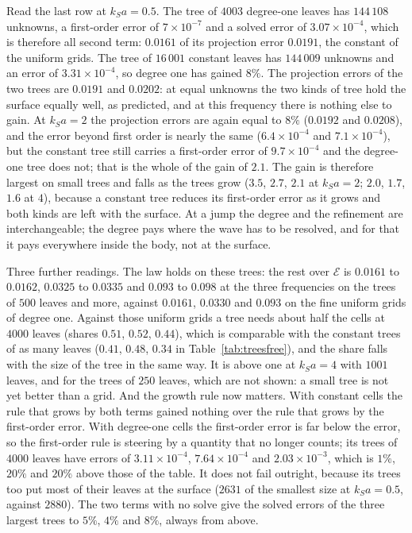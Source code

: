 \documentclass[11pt,a4paper]{article}
\newcommand{\cE}{\mathcal{E}}
\begin{document}
Read the last row at $k_Sa=0.5$. The tree of $4003$ degree-one leaves has $144\,108$ unknowns, a
first-order error of $7\times10^{-7}$ and a solved error of $3.07\times10^{-4}$, which is therefore all
second term: $0.0161$ of its projection error $0.0191$, the constant of the uniform grids. The tree of
$16\,001$ constant leaves has $144\,009$ unknowns and an error of $3.31\times10^{-4}$, so degree one has
gained $8\%$. The projection errors of the two trees are $0.0191$ and $0.0202$: at equal unknowns the two
kinds of tree hold the surface equally well, as predicted, and at this frequency there is nothing else
to gain. At $k_Sa=2$ the projection errors are again equal to $8\%$ ($0.0192$ and $0.0208$), and the
error beyond first order is nearly the same ($6.4\times10^{-4}$ and $7.1\times10^{-4}$), but the
constant tree still carries a first-order error of $9.7\times10^{-4}$ and the degree-one tree does not;
that is the whole of the gain of $2.1$. The gain is therefore largest on small trees and falls as the
trees grow ($3.5$, $2.7$, $2.1$ at $k_Sa=2$; $2.0$, $1.7$, $1.6$ at $4$), because a constant tree
reduces its first-order error as it grows and both kinds are left with the surface. At a jump the
degree and the refinement are interchangeable; the degree pays where the wave has to be resolved, and
for that it pays everywhere inside the body, not at the surface.

Three further readings. The law holds on these trees: the rest over $\cE$ is $0.0161$ to $0.0162$,
$0.0325$ to $0.0335$ and $0.093$ to $0.098$ at the three frequencies on the trees of $500$ leaves and
more, against $0.0161$, $0.0330$ and $0.093$ on the fine uniform grids of degree one. Against those
uniform grids a tree needs about half the cells at $4000$ leaves (shares $0.51$, $0.52$, $0.44$),
which is comparable with the constant trees of as many leaves ($0.41$, $0.48$, $0.34$ in
Table~\ref{tab:treesfree}), and the share falls with the size of the tree in the same way. It is above
one at $k_Sa=4$ with $1001$ leaves, and for the trees of $250$ leaves, which are not shown: a small
tree is not yet better than a grid. And the growth rule now matters.
With constant cells the rule that grows by both terms gained nothing over the rule that grows by the
first-order error. With degree-one cells the first-order error is far below the error, so the
first-order rule is steering by a quantity that no longer counts; its trees of $4000$ leaves have
errors of $3.11\times10^{-4}$, $7.64\times10^{-4}$ and $2.03\times10^{-3}$, which is $1\%$, $20\%$ and
$20\%$ above those of the table. It does not fail outright, because its trees too put most of their
leaves at the surface ($2631$ of the smallest size at $k_Sa=0.5$, against $2880$). The two terms with no
solve give the solved errors of
the three largest trees to $5\%$, $4\%$ and $8\%$, always from above.
\end{document}
